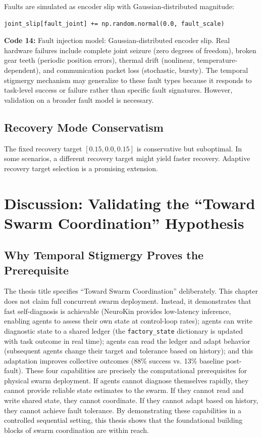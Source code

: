 \documentclass[12pt,a4paper,oneside]{report}
\begin{document}
Faults are simulated as encoder slip with Gaussian-distributed magnitude:
\begin{verbatim}
joint_slip[fault_joint] += np.random.normal(0.0, fault_scale)
\end{verbatim}
\vspace{0.2cm}
{\small \textbf{Code 14:} Fault injection model: Gaussian-distributed encoder slip.\label{code:fault_injection}}
\vspace{0.3cm}
Real hardware failures include complete joint seizure (zero degrees of freedom), broken gear teeth (periodic position errors), thermal drift (nonlinear, temperature-dependent), and communication packet loss (stochastic, bursty). The temporal stigmergy mechanism may generalize to these fault types because it responds to task-level success or failure rather than specific fault signatures. However, validation on a broader fault model is necessary.

\subsection{Recovery Mode Conservatism}
\label{subsec:recovery_mode_conservatism}

The fixed recovery target $[0.15, 0.0, 0.15]$ is conservative but suboptimal. In some scenarios, a different recovery target might yield faster recovery. Adaptive recovery target selection is a promising extension.

\section{Discussion: Validating the ``Toward Swarm Coordination'' Hypothesis}

\subsection{Why Temporal Stigmergy Proves the Prerequisite}
\label{subsec:why_temporal_stigmergy_proves_the_prerequisite}

The thesis title specifies ``Toward Swarm Coordination'' deliberately. This chapter does not claim full concurrent swarm deployment. Instead, it demonstrates that fast self-diagnosis is achievable (NeuroKin provides low-latency inference, enabling agents to assess their own state at control-loop rates); agents can write diagnostic state to a shared ledger (the \texttt{factory\_state} dictionary is updated with task outcome in real time); agents can read the ledger and adapt behavior (subsequent agents change their target and tolerance based on history); and this adaptation improves collective outcomes (88\% success vs. 13\% baseline post-fault). These four capabilities are precisely the computational prerequisites for physical swarm deployment. If agents cannot diagnose themselves rapidly, they cannot provide reliable state estimates to the swarm. If they cannot read and write shared state, they cannot coordinate. If they cannot adapt based on history, they cannot achieve fault tolerance. By demonstrating these capabilities in a controlled sequential setting, this thesis shows that the foundational building blocks of swarm coordination are within reach.
\end{document}
